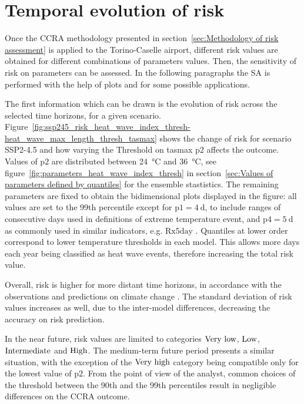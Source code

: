 \section{Temporal evolution of risk}
Once the \gls{CCRA} methodology presented in section~\ref{sec:Methodology of risk assessment} is applied to the Torino-Caselle airport, different \gls{risk} values are obtained for different combinations of parameters values.
Then, the sensitivity of risk on parameters can be assessed. In the following paragraphs the \gls{SA} is performed with the help of plots and for some possible applications.

The first information which can be drawn is the evolution of \gls{risk} across the selected time horizons, for a given scenario. Figure~\ref{fig:ssp245_risk_heat_wave_index_thresh-heat_wave_max_length_thresh_tasmax} shows the change of risk for scenario SSP2-4.5 and how varying the {Threshold on \gls{tasmax}} $\mathrm{p2}$ affects the outcome. Values of $\mathrm{p2}$ are distributed between \qty{24}{\degreeCelsius} and \qty{36}{\degreeCelsius}, see figure~\ref{fig:parameters_heat_wave_index_thresh} in section~\ref{sec:Values of parameters defined by quantiles} for the ensemble stastistics.
The remaining parameters are fixed to obtain the bidimensional plots displayed in the figure: all values are set to the 99th percentile except for $\mathrm{p1} = \qty{4}{\day}$, to include ranges of consecutive days used in definitions of extreme temperature event, and $\mathrm{p4} = \qty{5}{\day}$ as commonly used in similar indicators, e.g. $\mathrm{Rx5day}$ \cite[2208]{2021GutierrezAnnexVI}.
Quantiles at lower order correspond to lower temperature thresholds in each model. This allows more days each year being classified as heat wave events, therefore increasing the total risk value.

Overall, risk is higher for more distant time horizons, in accordance with the observations and predictions on climate change \cite[8-19]{2022IPCCClimateChange}. The standard deviation of risk values increases as well, due to the inter-model differences, decreasing the accuracy on risk prediction.

In the near future, risk values are limited to categories $\text{Very low}$, $\text{Low}$, $\text{Intermediate}$ and $\text{High}$. The medium-term future period presents a similar situation, with the exception of the $\text{Very high}$ category being compatible only for the lowest value of $\mathrm{p2}$. From the point of view of the analyst, common choices of the threshold between the 90th and the 99th percentiles result in negligible differences on the \gls{CCRA} outcome.

